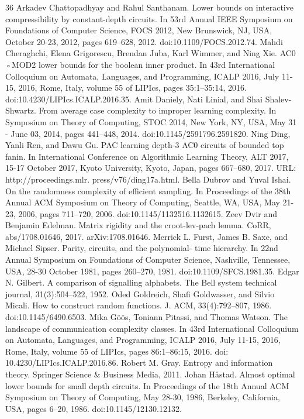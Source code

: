 \documentclass[10pt,a4paper]{article}
\begin{document}
\begin{thebibliography}{36}
Arkadev Chattopadhyay and Rahul Santhanam. Lower bounds on interactive compressibility by constant-depth circuits. In 53rd Annual IEEE Symposium on Foundations of Computer Science, FOCS 2012, New Brunswick, NJ, USA, October 20-23, 2012, pages 619–628, 2012. doi:10.1109/FOCS.2012.74.
Mahdi Cheraghchi, Elena Grigorescu, Brendan Juba, Karl Wimmer, and Ning Xie. AC0 ◦MOD2 lower bounds for the boolean inner product. In 43rd International Colloquium on Automata, Languages, and Programming, ICALP 2016, July 11-15, 2016, Rome, Italy, volume 55 of LIPIcs, pages 35:1–35:14, 2016. doi:10.4230/LIPIcs.ICALP.2016.35.
Amit Daniely, Nati Linial, and Shai Shalev-Shwartz. From average case complexity to improper learning complexity. In Symposium on Theory of Computing, STOC 2014, New York, NY, USA, May 31 - June 03, 2014, pages 441–448, 2014. doi:10.1145/2591796.2591820.
Ning Ding, Yanli Ren, and Dawu Gu. PAC learning depth-3 AC0 circuits of bounded top fanin. In International Conference on Algorithmic Learning Theory, ALT 2017, 15-17 October 2017, Kyoto University, Kyoto, Japan, pages 667–680, 2017. URL: http://proceedings.mlr. press/v76/ding17a.html.
Bella Dubrov and Yuval Ishai. On the randomness complexity of efficient sampling. In Proceedings of the 38th Annual ACM Symposium on Theory of Computing, Seattle, WA, USA, May 21-23, 2006, pages 711–720, 2006. doi:10.1145/1132516.1132615.
Zeev Dvir and Benjamin Edelman. Matrix rigidity and the croot-lev-pach lemma. CoRR, abs/1708.01646, 2017. arXiv:1708.01646.
Merrick L. Furst, James B. Saxe, and Michael Sipser. Parity, circuits, and the polynomial- time hierarchy. In 22nd Annual Symposium on Foundations of Computer Science, Nashville, Tennessee, USA, 28-30 October 1981, pages 260–270, 1981. doi:10.1109/SFCS.1981.35.
Edgar N. Gilbert. A comparison of signalling alphabets. The Bell system technical journal, 31(3):504–522, 1952.
Oded Goldreich, Shafi Goldwasser, and Silvio Micali. How to construct random functions. J. ACM, 33(4):792–807, 1986. doi:10.1145/6490.6503.
Mika Göös, Toniann Pitassi, and Thomas Watson. The landscape of communication complexity classes. In 43rd International Colloquium on Automata, Languages, and Programming, ICALP 2016, July 11-15, 2016, Rome, Italy, volume 55 of LIPIcs, pages 86:1–86:15, 2016. doi: 10.4230/LIPIcs.ICALP.2016.86.
Robert M. Gray. Entropy and information theory. Springer Science \& Business Media, 2011.
Johan Håstad. Almost optimal lower bounds for small depth circuits. In Proceedings of the 18th Annual ACM Symposium on Theory of Computing, May 28-30, 1986, Berkeley, California, USA, pages 6–20, 1986. doi:10.1145/12130.12132.

\end{thebibliography}
\end{document}
